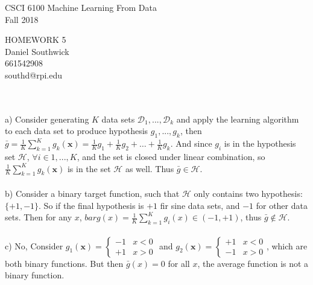 \documentclass[12pt]{article}
\begin{document}
\begin{center}
CSCI 6100 Machine Learning From Data\\
Fall 2018\\
\end{center}
\begin{center}
HOMEWORK 5\\
Daniel Southwick\\
661542908\\
southd@rpi.edu
\end{center}
\vspace{.1in}

 \\\\
\indent a) Consider generating $K$ data sets $\mathcal{D}_1,...,\mathcal{D}_k$ and apply the learning algorithm to each data set to produce hypothesis $g_1,...,g_k$, then $\displaystyle \bar{g} = \frac{1}{K}\sum_{k=1}^{K}g_k(\textbf{x}) = \frac{1}{K}g_1+\frac{1}{K}g_2+\dots+\frac{1}{K}g_k$. And since $g_i$ is in the hypothesis set $\mathcal{H}$, $\forall i \in {1,...,K}$, and the set is closed under linear combination, so $\displaystyle\frac{1}{K}\sum_{k=1}^{K}g_k(\textbf{x})$ is in the set $\mathcal{H}$ as well. Thus $\bar{g} \in \mathcal{H}$.\\\\
\indent b) Consider a binary target function, such that $\mathcal{H}$ only contains two hypothesis: $\{+1,-1\}$. So if the final hypothesis is $+1$ fir sine data sets, and $-1$ for other data sets. Then for any $x$, $\displaystyle bar{g}(x) = \frac{1}{K}\sum_{k=1}^{K}g_i(x) \in (-1,+1)$, thus $\bar{g} \not \in \mathcal{H}$.\\\\
\indent c) No, Consider $g_1(\textbf{x}) = 
			\left\lbrace \begin{array}{ll}
			-1 & x < 0 \\
			+1 & x> 0
			\end{array}\right.$
			and 
			$g_2(\textbf{x}) = 
			\left\lbrace \begin{array}{ll}
			+1 & x < 0 \\
			-1 & x> 0
			\end{array}\right.$, which are both binary functions. But then $\bar{g}(x) = 0$ for all $x$, the average function is not a binary function.\\\\
			
\end{document}
